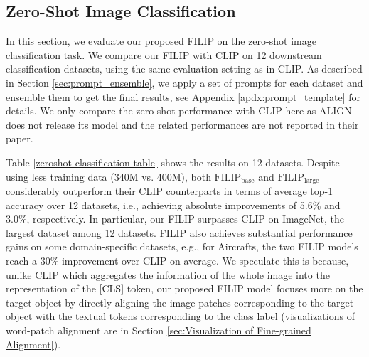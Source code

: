 
\vspace{-1mm}
\subsection{Zero-Shot Image Classification}
\label{sec:zeroshot_classification}
In this section, we evaluate our proposed FILIP on the zero-shot image classification task.
We compare our FILIP with CLIP \citep{radford2021learning} on 12 downstream classification datasets, using the same evaluation setting as in CLIP. As described in Section \ref{sec:prompt_ensemble}, we  apply a set of prompts for each dataset and ensemble them to get the final results, see Appendix \ref{apdx:prompt_template} for details. We only compare the zero-shot performance with CLIP here as ALIGN does not release its model and  the related performances are not reported in their paper.

Table \ref{zeroshot-classification-table} shows the results on 12 datasets.
Despite using less training data (340M vs. 400M), both $\text{FILIP}_{\text{base}}$ and $\text{FILIP}_{\text{large}}$ considerably outperform their CLIP counterparts in terms of average top-1 accuracy over 12 datasets, i.e., achieving  absolute improvements of 5.6\% and 3.0\%, respectively. In particular, our FILIP surpasses CLIP on  ImageNet, the largest dataset among 12 datasets.
FILIP also achieves substantial performance gains on some domain-specific datasets, e.g., for Aircrafts, the two FILIP models reach a 30\% improvement over CLIP on average. We speculate this is because,
unlike CLIP which aggregates the information of the whole image into the representation of the [CLS] token, our proposed FILIP model focuses more on the target object by directly aligning the image patches corresponding to the target object with the textual tokens corresponding to the class label (visualizations of word-patch alignment are in Section \ref{sec:Visualization of Fine-grained Alignment}).


